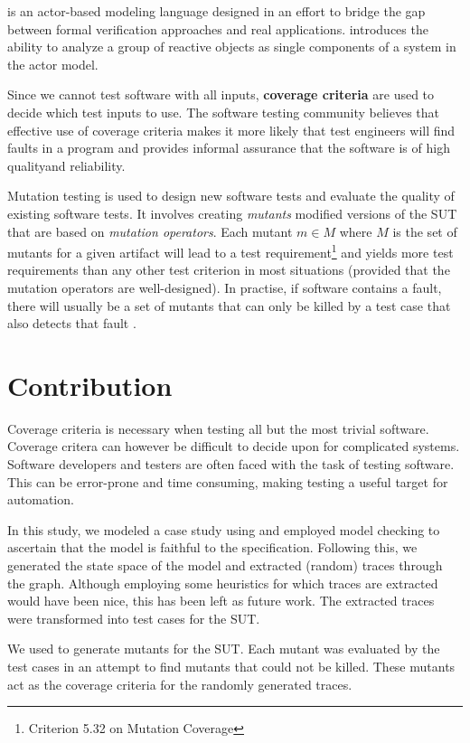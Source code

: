 \documentclass{article}
\begin{document}
		\Rebeca is an actor-based modeling language designed in an effort to bridge the gap between formal verification approaches and real applications. \Rebeca introduces the ability to analyze a group of reactive objects as single components of a system in the actor model.

		Since we cannot test software with all inputs, \textbf{coverage criteria} are used to decide which test inputs to use. The software testing community believes that effective use of coverage criteria makes it more likely that test engineers will find faults in a program and provides informal assurance that the software is of high qualityand reliability. 

		Mutation testing is used to design new software tests and evaluate the quality of existing software tests. It involves creating \textit{mutants} modified versions of the SUT that are based on \textit{mutation operators}. Each mutant $m \in M$ where $M$ is the set of mutants for a given artifact will lead to a test requirement\footnote{Criterion 5.32 on Mutation Coverage} and yields more test requirements than any other test criterion in most situations (provided that the mutation operators are well-designed). In practise, if software contains a fault, there will usually be a set of mutants that can only be killed by a test case that also detects that fault \citep{ammann2008introduction}.

	\section{Contribution}
		Coverage criteria is necessary when testing all but the most trivial software. Coverage critera can however be difficult to decide upon for complicated systems. Software developers and testers are often faced with the task of testing software. This can be error-prone and time consuming, making testing a useful target for automation.

		In this study, we modeled a case study using \Rebeca and employed model checking to ascertain that the model is faithful to the specification. Following this, we generated the state space of the model and extracted (random) traces through the graph. Although employing some heuristics for which traces are extracted would have been nice, this has been left as future work. The extracted traces were transformed into test cases for the SUT.

		We used \citeauthor{mujava} to generate mutants for the SUT. Each mutant was evaluated by the test cases in an attempt to find mutants that could not be killed. These mutants act as the coverage criteria for the randomly generated traces.
\end{document}
